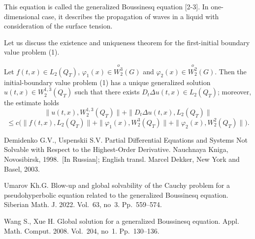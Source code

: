 \documentclass[12pt]{llncs}
\begin{document}
This equation is called the generalized Boussinesq equation [2-3]. In one-dimensional case, it describes the propagation of waves in a liquid with consideration of the surface tension.

Let us discuss the existence and uniqueness theorem for the first-initial boundary value problem (1).

\begin{theorem} Let $f(t,x)\in L_2(Q_T)$, 
	$\displaystyle\varphi_1(x)\in \overset{o}{W^3_2}(G)$ and 
	$\displaystyle\varphi_2(x)\in \overset{o}{W^2_2}(G)$. Then the initial-boundary value problem (1) has a unique generalized solution $u(t,x)\in W^{1,3}_{2}(Q_T)$ such that there exists
	$D_{t}\Delta u(t,x)\in L_2(Q_T)$; moreover, the estimate holds 
	$$
	\|u(t,x),W^{1,3}_{2}(Q_T)\| +\|D_{t}\Delta u(t,x),L_{2}(Q_T)\|
	$$
	$$
	\le c\bigg(\|f(t,x),L_2(Q_T)\|+\|\varphi_1(x),W^{3}_{2}(Q_T)\|+\|\varphi_2(x),W ^{2}_{2}(Q_T)\|\bigg).
	$$
\end{theorem} 




\begin{thebibliography}{9} %
Demidenko G.V., Uspenskii S.V. Partial Differential Equations and Systems Not 	Solvable with Respect to the Highest-Order Derivative. Nauchnaya Kniga, Novosibirsk, 1998.~[In Russian]; English transl. Marcel Dekker, New York and Basel, 2003.

 Umarov Kh.G. Blow-up and global solvability of the Cauchy problem for a pseudohyperbolic equation related to the generalized Boussinesq equation. Siberian Math. J. 2022. Vol.~63, no~3. Pp.~559--574.

 Wang S., Xue H. Global solution for a generalized Boussinesq equation. Appl. Math. Comput. 2008. Vol.~204, no~1. Pp.~130--136.

\end{thebibliography}
\end{document}
